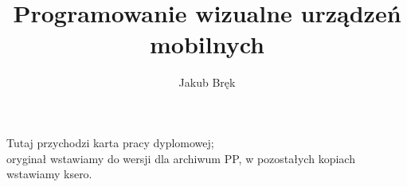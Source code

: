 \documentclass[polish,a4paper,twoside]{ppfcmthesis}
\author{Jakub Bręk}                              %
\title{Programowanie wizualne urządzeń mobilnych}        %
\begin{document}
\frontmatter\pagestyle{empty}%
\maketitle\cleardoublepage%

\pagebreak

\thispagestyle{empty}\vspace*{\fill}%
\begin{center}Tutaj przychodzi karta pracy dyplomowej;\\oryginał wstawiamy do wersji dla archiwum PP, w pozostałych kopiach wstawiamy ksero.\end{center}%
\vfill\cleardoublepage%

\pagebreak

\pagestyle{ppfcmthesis}%
\tableofcontents* \cleardoublepage%

\mainmatter%







\cleardoublepage\appendix%


{\raggedright\sloppy\small}

\ppcolophon
\end{document}
